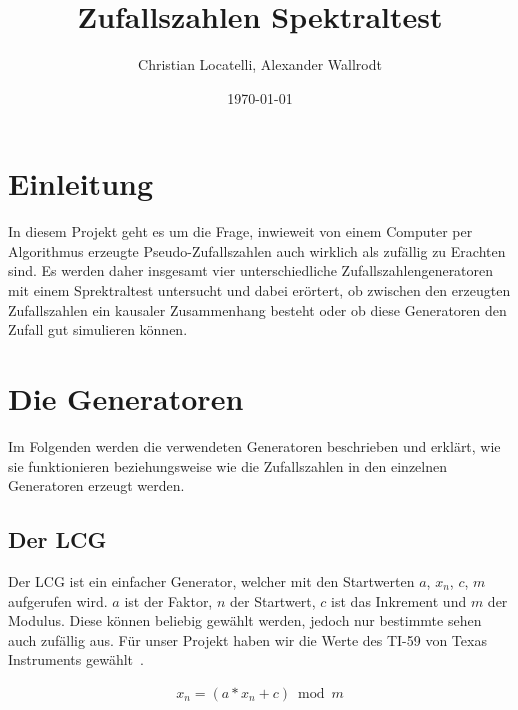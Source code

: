 \documentclass[12pt]{article}
\title{\textbf{Zufallszahlen Spektraltest}}
\author{Christian Locatelli, Alexander Wallrodt}
\date{\today}
\begin{document}
    \maketitle
    \clearpage

    \tableofcontents
    \listoftables
    \listoffigures

    \clearpage


    \section{Einleitung}\label{sec:Einleitung}
    In diesem Projekt geht es um die Frage, inwieweit von einem Computer per Algorithmus erzeugte Pseudo-Zufallszahlen
    auch wirklich als zufällig zu Erachten sind.
    Es werden daher insgesamt vier unterschiedliche Zufallszahlengeneratoren mit einem Sprektraltest untersucht und dabei erörtert,
    ob zwischen den erzeugten Zufallszahlen ein kausaler Zusammenhang besteht oder ob diese Generatoren den Zufall gut simulieren können.

    \section{Die Generatoren}\label{sec:die-generatoren}
    Im Folgenden werden die verwendeten Generatoren beschrieben und erklärt, wie sie funktionieren beziehungsweise wie
    die Zufallszahlen in den einzelnen Generatoren erzeugt werden.

    \subsection{Der LCG}\label{subsec:der-lcg}
    Der LCG ist ein einfacher Generator, welcher mit den Startwerten $a$, $x_n$, $c$, $m$ aufgerufen wird.
    $a$ ist der Faktor, $n$ der Startwert, $c$ ist das Inkrement und $m$ der Modulus.
    Diese können beliebig gewählt werden, jedoch nur bestimmte sehen auch zufällig aus.
    Für unser Projekt haben wir die Werte des TI-59 von Texas Instruments gewählt~\cite{lcg}.

    \begin{align*}
    x_n = (a * x_n + c) \bmod m
    \end{align*}
\end{document}
